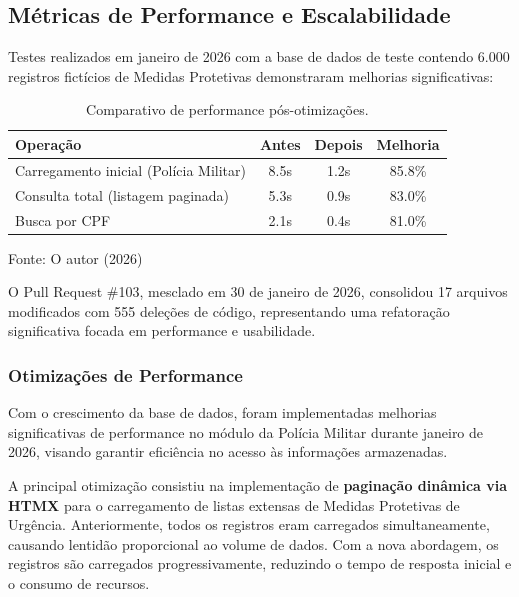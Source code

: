 \subsection{Métricas de Performance e Escalabilidade}
\par Testes realizados em janeiro de 2026 com a base de dados de teste contendo 6.000 registros fictícios de Medidas Protetivas demonstraram melhorias significativas:

\begin{table}[H]
\centering
\caption{Comparativo de performance pós-otimizações.}
\begin{tabular}{|l|c|c|c|}
\hline
\textbf{Operação} & \textbf{Antes} & \textbf{Depois} & \textbf{Melhoria} \\
\hline
Carregamento inicial (Polícia Militar) & 8.5s & 1.2s & 85.8\% \\
\hline
Consulta total (listagem paginada) & 5.3s & 0.9s & 83.0\% \\
\hline
Busca por CPF & 2.1s & 0.4s & 81.0\% \\
\hline
\end{tabular}

\label{tab:performance}
{\fontsize{10pt}{\baselineskip}\selectfont
    Fonte: O autor (2026)}
\end{table}

\par O Pull Request \#103, mesclado em 30 de janeiro de 2026, consolidou 17 arquivos modificados com 555 deleções de código, representando uma refatoração significativa focada em performance e usabilidade.

\subsubsection{Otimizações de Performance}
\par Com o crescimento da base de dados, foram implementadas melhorias significativas de performance no módulo da Polícia Militar durante janeiro de 2026, visando garantir eficiência no acesso às informações armazenadas.

\par A principal otimização consistiu na implementação de \textbf{paginação dinâmica via HTMX} para o carregamento de listas extensas de Medidas Protetivas de Urgência. Anteriormente, todos os registros eram carregados simultaneamente, causando lentidão proporcional ao volume de dados. Com a nova abordagem, os registros são carregados progressivamente, reduzindo o tempo de resposta inicial e o consumo de recursos.

